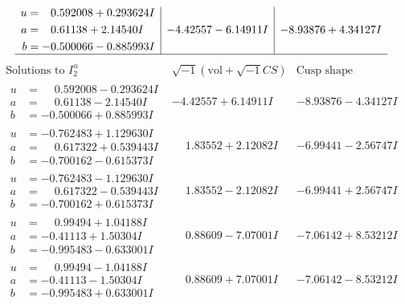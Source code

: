 \documentclass[1p]{elsarticle_modified}
\theoremstyle{definition}
\newcommand{\I}{\sqrt{-1}}
\begin{document}
$$\begin{array}{c|c|c}
\begin{aligned}
u &= \phantom{-}0.592008 + 0.293624 I \\
a &= \phantom{-}0.61138 + 2.14540 I \\
b &= -0.500066 - 0.885993 I\end{aligned}
 & -4.42557 - 6.14911 I & -8.93876 + 4.34127 I\\
 \hline 
 \end{array}$$\newpage$$\begin{array}{c|c|c}  
\text{Solutions to }I^u_{2}& \I (\text{vol} + \sqrt{-1}CS) & \text{Cusp shape}\\
 \hline 
\begin{aligned}
u &= \phantom{-}0.592008 - 0.293624 I \\
a &= \phantom{-}0.61138 - 2.14540 I \\
b &= -0.500066 + 0.885993 I\end{aligned}
 & -4.42557 + 6.14911 I & -8.93876 - 4.34127 I \\ \hline\begin{aligned}
u &= -0.762483 + 1.129630 I \\
a &= \phantom{-}0.617322 + 0.539443 I \\
b &= -0.700162 - 0.615373 I\end{aligned}
 & \phantom{-}1.83552 + 2.12082 I & -6.99441 - 2.56747 I \\ \hline\begin{aligned}
u &= -0.762483 - 1.129630 I \\
a &= \phantom{-}0.617322 - 0.539443 I \\
b &= -0.700162 + 0.615373 I\end{aligned}
 & \phantom{-}1.83552 - 2.12082 I & -6.99441 + 2.56747 I \\ \hline\begin{aligned}
u &= \phantom{-}0.99494 + 1.04188 I \\
a &= -0.41113 + 1.50304 I \\
b &= -0.995483 - 0.633001 I\end{aligned}
 & \phantom{-}0.88609 - 7.07001 I & -7.06142 + 8.53212 I \\ \hline\begin{aligned}
u &= \phantom{-}0.99494 - 1.04188 I \\
a &= -0.41113 - 1.50304 I \\
b &= -0.995483 + 0.633001 I\end{aligned}
 & \phantom{-}0.88609 + 7.07001 I & -7.06142 - 8.53212 I \\ \hline\begin{aligned}

\end{aligned}
\end{array}$$
\end{document}
